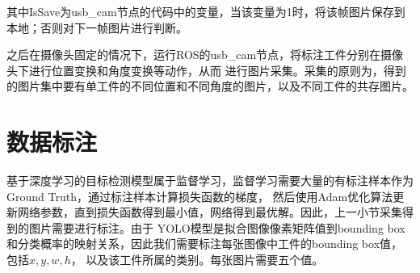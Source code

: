 其中IsSave为usb\_cam节点的代码中的变量，当该变量为1时，将该帧图片保存到本地；否则对下一帧图片进行判断。

之后在摄像头固定的情况下，运行ROS的usb\_cam节点，将标注工件分别在摄像头下进行位置变换和角度变换等动作，从而
进行图片采集。采集的原则为，得到的图片集中要有单工件的不同位置和不同角度的图片，以及不同工件的共存图片。

\section{数据标注}

基于深度学习的目标检测模型属于监督学习，监督学习需要大量的有标注样本作为Ground Truth，通过标注样本计算损失函数的梯度，
然后使用Adam优化算法更新网络参数，直到损失函数得到最小值，网络得到最优解。因此，上一小节采集得到的图片需要进行标注。由于
YOLO模型是拟合图像像素矩阵值到bounding box和分类概率的映射关系，因此我们需要标注每张图像中工件的bounding box值，包括$x , y , w , h$，
以及该工件所属的类别。每张图片需要五个值。

